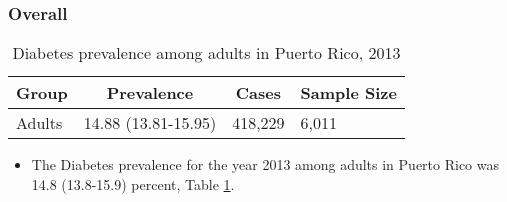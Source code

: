 
\subsubsection{Overall}




\begin{table}[H]
\caption{Diabetes prevalence among adults in Puerto Rico, 2013\label{tab:Overall.tabl.Diabetes.2013}} 
\begin{center}
\begin{tabular}{llll}
\hline\hline
\multicolumn{1}{l}{Group}&\multicolumn{1}{c}{Prevalence}&\multicolumn{1}{c}{Cases}&\multicolumn{1}{c}{Sample Size}\tabularnewline
\hline
Adults&14.88 (13.81-15.95)&418,229&6,011\tabularnewline
\hline
\end{tabular}\end{center}

\end{table}




\begin{itemize}


\item The Diabetes prevalence for the year 2013 among adults in Puerto Rico was 14.8 (13.8-15.9) percent, 
Table \ref{tab:Overall.tabl.Diabetes.2013}.

\end{itemize}



